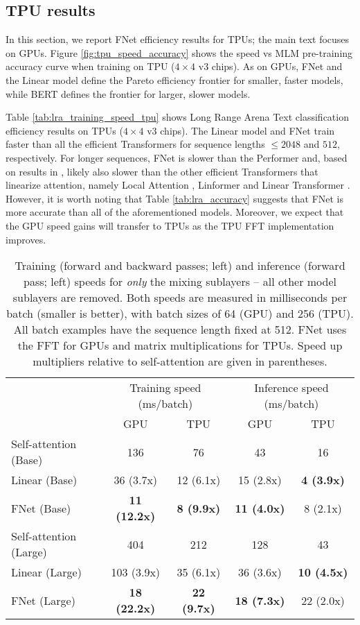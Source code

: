 \documentclass[11pt]{article}
\begin{document}
\subsection{TPU results}
\label{app:tpu}

In this section, we report FNet efficiency results for TPUs; the main text focuses on GPUs. Figure \ref{fig:tpu_speed_accuracy} shows the speed vs MLM pre-training accuracy curve when training on TPU ($4\times4$ v3 chips). As on GPUs, FNet and the Linear model define the Pareto efficiency frontier for smaller, faster models, while BERT defines the frontier for larger, slower models.

Table \ref{tab:lra_training_speed_tpu} shows Long Range Arena Text classification efficiency results on TPUs ($4\times4$ v3 chips). The Linear model and FNet train faster than all the efficient Transformers for sequence lengths $\leq2048$ and $512$, respectively. For longer sequences, FNet is slower than the Performer and, based on results in \citet{tay2020long}, likely also slower than the other efficient Transformers that linearize attention, namely Local Attention \citep{parmar2018image}, Linformer \citep{wang2020linformer} and Linear Transformer \citep{katharopoulos2020transformers}. However, it is worth noting that Table \ref{tab:lra_accuracy} suggests that FNet is more accurate than all of the aforementioned models. Moreover, we expect that the GPU speed gains will transfer to TPUs as the TPU FFT implementation improves.


\begin{table*}
    \caption{Training (forward and backward passes; left) and inference (forward pass; left) speeds for \emph{only} the mixing sublayers -- all other model sublayers are removed. Both speeds are measured in milliseconds per batch (smaller is better), with batch sizes of 64 (GPU) and 256 (TPU). All batch examples have the sequence length fixed at 512. FNet uses the FFT for GPUs and matrix multiplications for TPUs. Speed up multipliers relative to self-attention are given in parentheses.}
    \label{tab:mixing_speeds}
    \centering
    \begin{tabular}{l | c c | c c}
        \hline
         & \multicolumn{2}{c|}{Training speed (ms/batch)} & \multicolumn{2}{c}{Inference speed (ms/batch)} \\ 
         & GPU & TPU & GPU & TPU\\ \hline \hline
         Self-attention (Base) & 136 & 76 & 43 & 16 \\
         Linear (Base) & 36 (3.7x) & 12 (6.1x) & 15 (2.8x) & \textbf{4 (3.9x)} \\
         FNet (Base) & \textbf{11 (12.2x)} & \textbf{8 (9.9x)} & \textbf{11 (4.0x)} & 8 (2.1x) \\ \hline
         Self-attention (Large) & 404 & 212 & 128 & 43 \\
         Linear (Large) & 103 (3.9x) & 35 (6.1x) & 36 (3.6x) & \textbf{10 (4.5x)} \\
         FNet (Large) & \textbf{18 (22.2x)} & \textbf{22 (9.7x)} & \textbf{18 (7.3x)} & 22 (2.0x)\\ \hline
    \end{tabular}
\end{table*}
\end{document}

